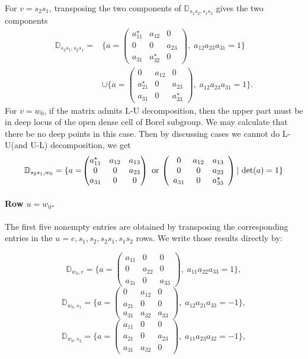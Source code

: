 \documentclass[12pt]{amsart}
\newcommand{\D}{\mathbb D}
\theoremstyle{plain}
\theoremstyle{definition}
\theoremstyle{remark}
\begin{document}
For \(v=s_2s_1\), transposing the two components of
\(\D_{s_1s_2,s_1s_2}\) gives the two components
\[
\begin{aligned}
\D_{s_2s_1,s_2s_1}
={}&
\{a=\!\left(
\begin{array}{ccc}
a_{11}^\star &a_{12}&0\\
0&0&a_{23}\\
a_{31}& a_{32}^\star &0
\end{array}
\right)\!,\;a_{12}a_{23}a_{31}=1\}\\
&\cup
\{a=\!\left(
\begin{array}{ccc}
0&a_{12}&0\\
a_{21}^\star &0&a_{23}\\
a_{31}&0&a_{33}^\star
\end{array}
\right)\!,\;a_{12}a_{23}a_{31}=1\}.
\end{aligned}
\]
For \(v=w_0\), if the matrix admits L-U decomposition, then the upper part must be in deep locus of the open dense cell of Borel subgroup. We may calculate that there be no deep points in this case. Then by discussing cases we cannot do L-U(and U-L) decomposition, we get
\[
\D_{s_2s_1,w_0}
=\{a=\!
\begin{pmatrix}
a_{11}^\star&a_{12}&a_{13} \\
0&0&a_{23} \\
a_{31}&0&0
\end{pmatrix}
\textup{ or }\!\left(
\begin{array}{ccc}
0&a_{12}&a_{13}\\
0&0&a_{23}\\
a_{31}&0&a_{33}^\star
\end{array}
\right)| \textup{ det}(a)=1\}
\]
\paragraph{\bf Row \(u=w_0\).}
The first five nonempty entries are obtained by transposing the corresponding
entries in the \(u=e,s_1,s_2,s_2s_1,s_1s_2\) rows.  We write those results directly by:

\[
\D_{w_0,e}
=\{a=\!\left(
\begin{array}{ccc}
a_{11}&0&0\\
0&a_{22}&0\\
a_{31}&0&a_{33}
\end{array}
\right)\!,\;a_{11}a_{22}a_{33}=1\},
\]
\[
\D_{w_0,s_1}
=\{a=\!\left(
\begin{array}{ccc}
0&a_{12}&0\\
a_{21}&0&0\\
a_{31}&a_{32}&a_{33}
\end{array}
\right)\!,\;a_{12}a_{21}a_{33}=-1\},
\]
\[
\D_{w_0,s_2}
=\{a=\!\left(
\begin{array}{ccc}
a_{11}&0&0\\
a_{21}&0&a_{23}\\
a_{31}&a_{32}&0
\end{array}
\right)\!,\;a_{11}a_{23}a_{32}=-1\},
\]
\end{document}
